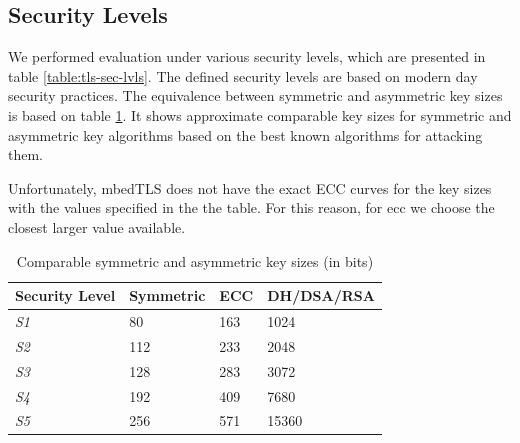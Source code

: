 \subsection{Security Levels} \label{sec:sls}

We performed evaluation under various security levels, which are presented in table \ref{table:tls-sec-lvls}.
The defined security levels are based on modern day security practices. The equivalence between symmetric and asymmetric
key sizes  is based on table \ref{table:ecc-key-sizes}. It shows approximate comparable key sizes for symmetric
and asymmetric key algorithms based on the best known algorithms for attacking them\cite{RFC4492}.

Unfortunately, mbedTLS does not have
the exact ECC curves for the  key sizes with the values specified in the the table. For this reason, for \gls{ecc}
we choose the closest larger value available.


\begin{table}[]
\begin{tabular}{|l|l|l|l|}
\hline
Security Level & Symmetric & ECC & DH/DSA/RSA \\ \hline
\textit{S1}    & 80        & 163 & 1024       \\ \hline
\textit{S2}    & 112       & 233 & 2048       \\ \hline
\textit{S3}    & 128       & 283 & 3072       \\ \hline
\textit{S4}    & 192       & 409 & 7680       \\ \hline
\textit{S5}    & 256       & 571 & 15360      \\ \hline
\end{tabular}
\centering \caption{\label{table:ecc-key-sizes} Comparable symmetric and asymmetric key sizes (in bits)}
\end{table}

